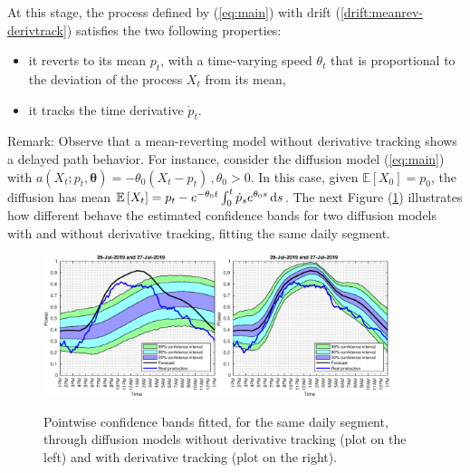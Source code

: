 \documentclass[11pt]{article}
\theoremstyle{definition}
\begin{document}
 At this stage, the process defined by (\ref{eq:main}) with drift (\ref{drift:meanrev-derivtrack}) satisfies the two following properties: 
\begin{itemize}
\item it reverts to its mean $p_t$, with a time-varying speed $ \theta_t$ that is proportional to the deviation of the process $X_t$ from its mean,
\item it tracks the time derivative $\dot{p}_t$.  
\end{itemize} 

Remark: Observe that a mean-reverting model without derivative tracking shows a delayed path behavior. For instance, consider the diffusion model (\ref{eq:main}) with $a(X_t; p_t, \bm{\theta}) = - \theta_0 (X_t - p_t)\,, \theta_0 > 0$. In this case, given  $ \mathbb{E} \left[X_0\right] = p_0$, the diffusion has mean $\mathbb{E} \left[X_t\right] = p_t - e^{- \theta_0 t } \int_0^t \dot{p}_s  e^{\theta_0 s} \dif s$. The next Figure (\ref{fig:derivative_tracking}) illustrates how different behave the estimated confidence bands for two diffusion models with and without derivative tracking, fitting the same daily segment.

\begin{figure}[H]
\centering
  \includegraphics[width=0.45\textwidth]{plots/31.eps}\includegraphics[width=0.45\textwidth]{plots/31_2.eps}
  \caption{Pointwise confidence bands fitted, for the same daily segment, through diffusion models without derivative tracking (plot on the left) and with derivative tracking (plot on the right).}
  \label{fig:derivative_tracking}
\end{figure}
\end{document}
